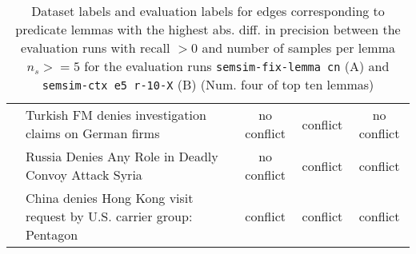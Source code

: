\begin{sidewaystable}[ht]
\begin{tabular}{l p{13cm} ccc}
& Turkish FM denies investigation claims on German firms & no conflict & conflict & no conflict \\
& Russia Denies Any Role in Deadly Convoy Attack Syria & no conflict & conflict & conflict \\
& China denies Hong Kong visit request by U.S. carrier group: Pentagon & conflict & conflict & conflict \\
\bottomrule
\end{tabular}
\caption{Dataset labels and evaluation labels for edges corresponding to predicate lemmas with the highest abs. diff. in precision between the evaluation runs with recall \(> 0\) and number of samples per lemma \(n_s >= 5\) for the evaluation runs \texttt{semsim-fix-lemma cn} (A) and \texttt{semsim-ctx e5 r-10-X} (B) (Num. four of top ten lemmas)}
\end{sidewaystable}


